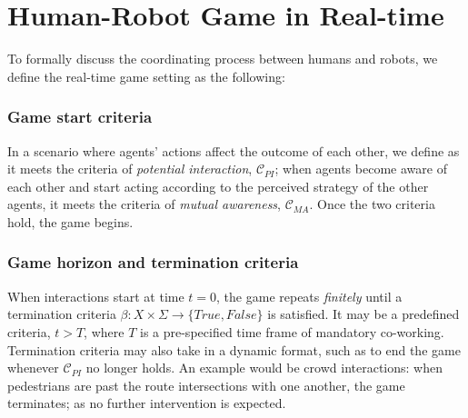\documentclass[letterpaper, 10 pt, conference]{ieeeconf}  %
\begin{document}
\section{Human-Robot Game in Real-time}\label{sec:realtime_game}
To formally discuss the coordinating process between humans and robots, we define the real-time game setting as the following: 
\subsubsection{Game start criteria}
In a scenario where agents' actions affect the outcome of each other, we 
define as it meets the criteria of \textit{potential interaction}, 
$\mathcal{C}_{PI}$; when agents become aware of each other and start acting 
according to the perceived strategy of the other agents, it meets the criteria 
of \textit{mutual awareness}, $\mathcal{C}_{MA}$. Once the two criteria hold, 
the game begins. 
\subsubsection{Game horizon and termination criteria}
When interactions start at time $t=0$, the game repeats \textit{finitely} 
until a termination criteria 
$\beta: X \times \Sigma \rightarrow \{True,False\}$ is satisfied. It may be a 
predefined criteria, $t>T$, where $T$ is a pre-specified time frame of 
mandatory co-working. Termination criteria may also take in a dynamic format, 
such as to end the game whenever $\mathcal{C}_{PI}$ no longer holds. An 
example would be crowd interactions: when pedestrians are past the route 
intersections with one another, the game terminates; as no further intervention is 
expected.
\end{document}
